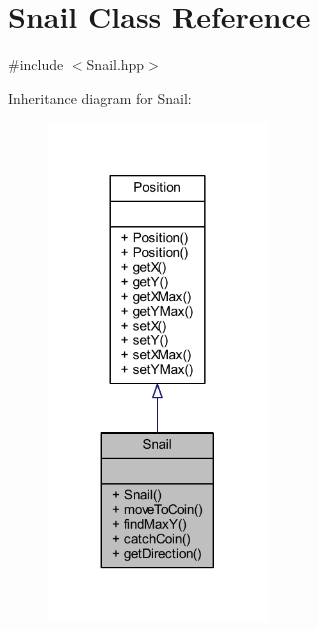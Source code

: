 \hypertarget{class_snail}{}\section{Snail Class Reference}
\label{class_snail}


{\ttfamily \#include $<$Snail.\+hpp$>$}



Inheritance diagram for Snail\+:
\nopagebreak
\begin{figure}[H]
\begin{center}
\leavevmode
\includegraphics[width=164pt]{class_snail__inherit__graph}
\end{center}
\end{figure}


